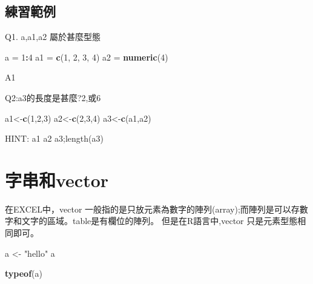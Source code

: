 \documentclass[]{book}
\newenvironment{Shaded}{\begin{snugshade}}{\end{snugshade}}
\newcommand{\DecValTok}[1]{\textcolor[rgb]{0.00,0.00,0.81}{#1}}
\newcommand{\KeywordTok}[1]{\textcolor[rgb]{0.13,0.29,0.53}{\textbf{#1}}}
\newcommand{\NormalTok}[1]{#1}
\newcommand{\OperatorTok}[1]{\textcolor[rgb]{0.81,0.36,0.00}{\textbf{#1}}}
\newcommand{\StringTok}[1]{\textcolor[rgb]{0.31,0.60,0.02}{#1}}
\theoremstyle{definition}
\theoremstyle{definition}
\theoremstyle{definition}
\theoremstyle{remark}
\begin{document}
\subsection{練習範例}

Q1. a,a1,a2 屬於甚麼型態

\begin{Shaded}
\begin{Highlighting}[]
\NormalTok{a =}\StringTok{ }\DecValTok{1}\OperatorTok{:}\DecValTok{4}
\NormalTok{a1 =}\StringTok{ }\KeywordTok{c}\NormalTok{(}\DecValTok{1}\NormalTok{, }\DecValTok{2}\NormalTok{, }\DecValTok{3}\NormalTok{, }\DecValTok{4}\NormalTok{)}
\NormalTok{a2 =}\StringTok{ }\KeywordTok{numeric}\NormalTok{(}\DecValTok{4}\NormalTok{)}
\end{Highlighting}
\end{Shaded}

A1

Q2:a3的長度是甚麼?2,或6

\begin{Shaded}
\begin{Highlighting}[]
\NormalTok{a1<-}\KeywordTok{c}\NormalTok{(}\DecValTok{1}\NormalTok{,}\DecValTok{2}\NormalTok{,}\DecValTok{3}\NormalTok{)}
\NormalTok{a2<-}\KeywordTok{c}\NormalTok{(}\DecValTok{2}\NormalTok{,}\DecValTok{3}\NormalTok{,}\DecValTok{4}\NormalTok{)}
\NormalTok{a3<-}\KeywordTok{c}\NormalTok{(a1,a2)}
\end{Highlighting}
\end{Shaded}

HINT: a1 a2 a3;length(a3)

\hypertarget{vector}{%
\section{字串和vector}\label{vector}}

在EXCEL中，vector
一般指的是只放元素為數字的陣列(array);而陣列是可以存數字和文字的區域。table是有欄位的陣列。
但是在R語言中,vector 只是元素型態相同即可。

\begin{Shaded}
\begin{Highlighting}[]
\NormalTok{a <-}\StringTok{ "hello"}
\NormalTok{a}
\end{Highlighting}
\end{Shaded}

\begin{Shaded}
\begin{Highlighting}[]
\KeywordTok{typeof}\NormalTok{(a)}
\end{Highlighting}
\end{Shaded}
\end{document}
